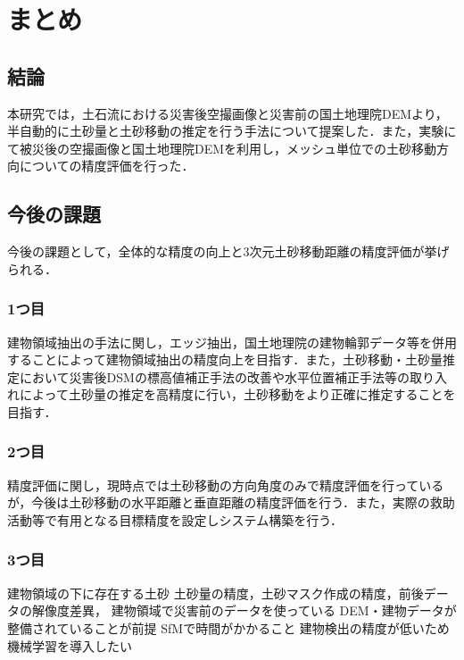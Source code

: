 \chapter{まとめ}
  \section{結論}
    本研究では，土石流における災害後空撮画像と災害前の国土地理院DEMより，半自動的に土砂量と土砂移動の推定を行う手法について提案した．また，実験にて被災後の空撮画像と国土地理院DEMを利用し，メッシュ単位での土砂移動方向についての精度評価を行った．


  \section{今後の課題}
    今後の課題として，全体的な精度の向上と3次元土砂移動距離の精度評価が挙げられる．

    \subsection{1つ目}
      建物領域抽出の手法に関し，エッジ抽出，国土地理院の建物輪郭データ等を併用することによって建物領域抽出の精度向上を目指す．また，土砂移動・土砂量推定において災害後DSMの標高値補正手法の改善や水平位置補正手法\cite{課題1}等の取り入れによって土砂量の推定を高精度に行い，土砂移動をより正確に推定することを目指す．

    \subsection{2つ目}
      精度評価に関し，現時点では土砂移動の方向角度のみで精度評価を行っているが，今後は土砂移動の水平距離と垂直距離の精度評価を行う．また，実際の救助活動等で有用となる目標精度を設定しシステム構築を行う．

    \subsection{3つ目}
      建物領域の下に存在する土砂
      土砂量の精度，土砂マスク作成の精度，前後データの解像度差異，
      建物領域で災害前のデータを使っている
      DEM・建物データが整備されていることが前提
      SfMで時間がかかること
      建物検出の精度が低いため機械学習を導入したい
